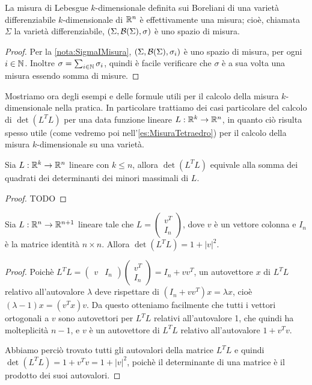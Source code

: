 \begin{theorem}
	La misura di Lebesgue $k$-dimensionale definita sui Boreliani di una varietà differenziabile $k$-dimensionale di $\mathbb R^n$ è effettivamente una misura; cioè, chiamata $\Sigma$ la varietà differenziabile, $(\Sigma,\mathcal B(\Sigma),\sigma)$ è uno spazio di misura.
\end{theorem}
\begin{proof}
	Per la \cref{nota:SigmaIMisura}, $(\Sigma,\mathcal B(\Sigma),\sigma_i)$ è uno spazio di misura, per ogni $i\in\mathbb N$. Inoltre $\sigma=\sum_{i\in\mathbb N}\sigma_i$, quindi è facile verificare che $\sigma$ è a sua volta una misura essendo somma di misure.
\end{proof}

Mostriamo ora degli esempi e delle formule utili per il calcolo della misura $k$-dimensionale nella pratica. In particolare trattiamo dei casi particolare del calcolo di $\det(L^TL)$ per una data funzione lineare $L:\mathbb R^k\to\mathbb R^n$, in quanto ciò risulta spesso utile (come vedremo poi nell'\cref{es:MisuraTetraedro}) per il calcolo della misura $k$-dimensionale su una varietà.

\begin{proposition}\label{prop:DeterminanteProdottoTrasposta}
	Sia $L:\mathbb R^k\to\mathbb R^n$ lineare con $k\le n$, allora $\det(L^TL)$ equivale alla somma dei quadrati dei determinanti dei minori massimali di $L$.
\end{proposition}
\begin{proof}
	TODO
\end{proof}

\begin{lemma}\label{lemma:DeterminanteMatriceQuasiIdentita}
	Sia $L:\mathbb R^n\to\mathbb R^{n+1}$ lineare tale che $L=\begin{pmatrix} v^T \\ I_n \end{pmatrix}$, dove $v$ è un vettore colonna e $I_n$ è la matrice identità $n\times n$. Allora $\det(L^TL)=1+\lvert v \rvert ^2$.
\end{lemma}
\begin{proof}
	Poichè $L^TL=\begin{pmatrix} v & I_n \end{pmatrix}\begin{pmatrix} v^T \\ I_n \end{pmatrix}=I_n+vv^T$, un autovettore $x$ di $L^TL$ relativo all'autovalore $\lambda$ deve rispettare di $(I_n+vv^T)x=\lambda x$, cioè $(\lambda-1)x=(v^Tx)v$. Da questo otteniamo facilmente che tutti i vettori ortogonali a $v$ sono autovettori per $L^TL$ relativi all'autovalore 1, che quindi ha molteplicità $n-1$, e $v$ è un autovettore di $L^TL$ relativo all'autovalore $1+v^Tv$.
	
	Abbiamo perciò trovato tutti gli autovalori della matrice $L^TL$ e quindi $\det(L^TL)=1+v^Tv=1+\lvert v \rvert ^2$, poichè il determinante di una matrice è il prodotto dei suoi autovalori.
\end{proof}

